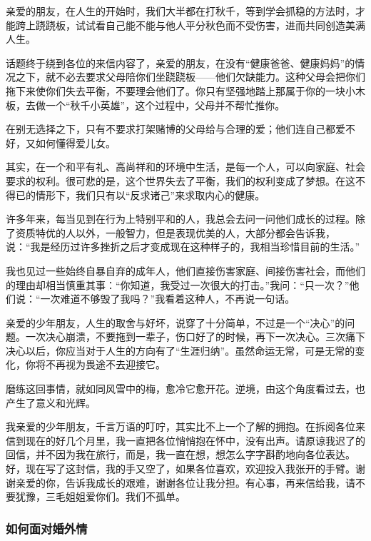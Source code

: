 \par 亲爱的朋友，在人生的开始时，我们大半都在打秋千，等到学会抓稳的方法时，才能跨上跷跷板，试试看自己能不能与他人平分秋色而不受伤害，进而共同创造美满人生。
\par 话题终于绕到各位的来信内容了，亲爱的朋友，在没有“健康爸爸、健康妈妈”的情况之下，就不必去要求父母陪你们坐跷跷板——他们欠缺能力。这种父母会把你们拖下来使你们失去平衡，不要理会他们了。你只有坚强地踏上那属于你的一块小木板，去做一个“秋千小英雄”，这个过程中，父母并不帮忙推你。
\par 在别无选择之下，只有不要求打架赌博的父母给与合理的爱；他们连自己都爱不好，又如何懂得爱儿女。
\par 其实，在一个和平有礼、高尚祥和的环境中生活，是每一个人，可以向家庭、社会要求的权利。很可悲的是，这个世界失去了平衡，我们的权利变成了梦想。在这不得已的情形下，我们只有以“反求诸己”来求取内心的健康。
\par 许多年来，每当见到在行为上特别平和的人，我总会去问一问他们成长的过程。除了资质特优的人以外，一般智力，但是表现优美的人，大部分都会告诉我，说：“我是经历过许多挫折之后才变成现在这种样子的，我相当珍惜目前的生活。”
\par 我也见过一些始终自暴自弃的成年人，他们直接伤害家庭、间接伤害社会，而他们的理由却相当慎重其事：“你知道，我受过一次很大的打击。”我问：“只一次？”他们说：“一次难道不够毁了我吗？”我看着这种人，不再说一句话。
\par 亲爱的少年朋友，人生的取舍与好坏，说穿了十分简单，不过是一个“决心”的问题。一次决心崩溃，不要拖到一辈子，伤口好了的时候，再下一次决心。三次痛下决心以后，你应当对于人生的方向有了“生涯归纳”。虽然命运无常，可是无常的变化，你将不再视为畏途不去迎接它。
\par 磨练这回事情，就如同风雪中的梅，愈冷它愈开花。逆境，由这个角度看过去，也产生了意义和光辉。
\par 我亲爱的少年朋友，千言万语的叮咛，其实比不上一个了解的拥抱。在拆阅各位来信到现在的好几个月里，我一直把各位悄悄抱在怀中，没有出声。请原谅我迟了的回信，并不因为我在旅行，而是，我一直在想，想怎么字字斟酌地向各位表达。好，现在写了这封信，我的手又空了，如果各位喜欢，欢迎投入我张开的手臂。谢谢亲爱的你，告诉我成长的艰难，谢谢各位让我分担。有心事，再来信给我，请不要犹豫，三毛姐姐爱你们。我们不孤单。
\par {}





\subsubsection{如何面对婚外情}

